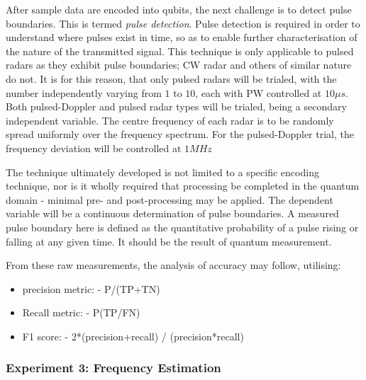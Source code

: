 After sample data are encoded into qubits, the next challenge is to detect pulse boundaries. This is termed \textit{pulse detection}.
Pulse detection is required in order to understand where pulses exist in time, so as to enable further characterisation of the nature of the transmitted signal.
This technique is only applicable to pulsed radars as they exhibit pulse boundaries; \ac{CW} radar and others of similar nature do not.
It is for this reason, that only pulsed radars will be trialed, with the number independently varying from $1$ to $10$, each with \ac{PW} controlled at $10 \mu s$.
Both pulsed-Doppler and pulsed radar types will be trialed, being a secondary independent variable.
The centre frequency of each radar is to be randomly spread uniformly over the frequency spectrum.
For the pulsed-Doppler trial, the frequency deviation will be controlled at $1MHz$

The technique ultimately developed is not limited to a specific encoding technique, nor is it wholly required that processing be completed in the quantum domain - minimal pre- and post-processing may be applied.
The dependent variable will be a continuous determination of pulse boundaries.
A measured pulse boundary here is defined as the quantitative probability of a pulse rising or falling at any given time.
It should be the result of quantum measurement.

From these raw measurements, the analysis of accuracy may follow, utilising:
\begin{itemize}
    \item precision metric:
-  P/(TP+TN)
    \item Recall metric:
-  P(TP/FN)
    \item F1 score:
-  2*(precision+recall) / (precision*recall)
\end{itemize}


\subsubsection{Experiment 3: Frequency Estimation}

